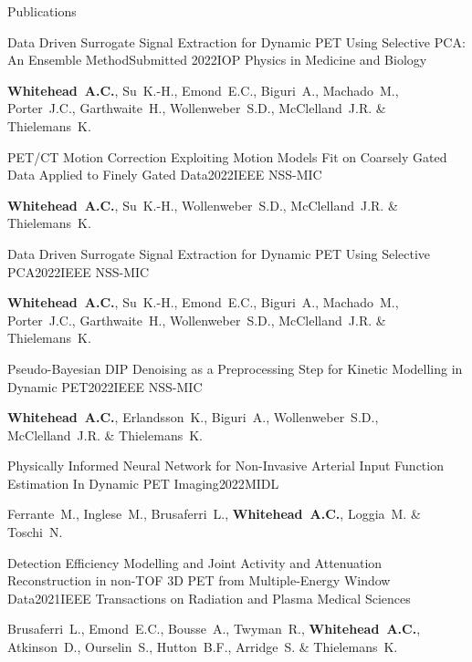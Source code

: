 \documentclass{cv}
\begin{document}
    \begin{rSection}{Publications}
        \begin{rSubsection}{Data Driven Surrogate Signal Extraction for Dynamic PET Using Selective PCA: An Ensemble Method}{Submitted 2022}{IOP Physics in Medicine and Biology}{}
            \item {\bf Whitehead~A.C.}, Su~K.-H., Emond~E.C., Biguri~A., Machado~M., Porter~J.C., Garthwaite~H., Wollenweber~S.D., McClelland~J.R. \& Thielemans~K.
        \end{rSubsection}
        
        \begin{rSubsection}{PET/CT Motion Correction Exploiting Motion Models Fit on Coarsely Gated Data Applied to Finely Gated Data}{2022}{IEEE NSS-MIC}{}
            \item {\bf Whitehead~A.C.}, Su~K.-H., Wollenweber~S.D., McClelland~J.R. \& Thielemans~K.
        \end{rSubsection}
        
        \begin{rSubsection}{Data Driven Surrogate Signal Extraction for Dynamic PET Using Selective PCA}{2022}{IEEE NSS-MIC}{}
            \item {\bf Whitehead~A.C.}, Su~K.-H., Emond~E.C., Biguri~A., Machado~M., Porter~J.C., Garthwaite~H., Wollenweber~S.D., McClelland~J.R. \& Thielemans~K.
        \end{rSubsection}
        
        \begin{rSubsection}{Pseudo-Bayesian DIP Denoising as a Preprocessing Step for Kinetic Modelling in Dynamic \newline PET}{2022}{IEEE NSS-MIC}{}
            \item {\bf Whitehead~A.C.}, Erlandsson~K., Biguri~A., Wollenweber~S.D., McClelland~J.R. \& Thielemans~K.
        \end{rSubsection}
        
        \begin{rSubsection}{Physically Informed Neural Network for Non-Invasive Arterial Input Function Estimation In Dynamic PET Imaging}{2022}{MIDL}{}
            \item Ferrante~M., Inglese~M., Brusaferri~L., {\bf Whitehead~A.C.}, Loggia~M. \& Toschi~N.
        \end{rSubsection}
        
        \begin{rSubsection}{Detection Efficiency Modelling and Joint Activity and Attenuation Reconstruction in non-TOF 3D PET from Multiple-Energy Window Data}{2021}{IEEE Transactions on Radiation and Plasma Medical Sciences}{}
            \item Brusaferri~L., Emond~E.C., Bousse~A., Twyman~R., {\bf Whitehead~A.C.}, Atkinson~D., Ourselin~S., Hutton~B.F., Arridge~S. \& Thielemans~K.
        \end{rSubsection}
        

\end{rSection}
\end{document}
